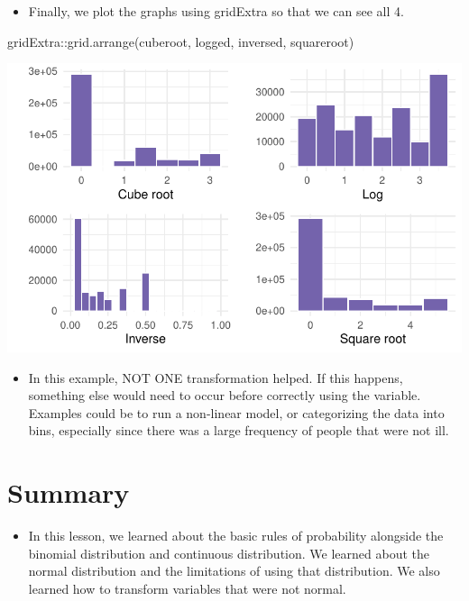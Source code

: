 \documentclass[
  letterpaper,
  DIV=11,
  numbers=noendperiod]{scrreprt}
\newenvironment{Shaded}{\begin{snugshade}}{\end{snugshade}}
\newcommand{\FunctionTok}[1]{\textcolor[rgb]{0.28,0.35,0.67}{#1}}
\newcommand{\NormalTok}[1]{\textcolor[rgb]{0.00,0.23,0.31}{#1}}
\newcommand{\SpecialCharTok}[1]{\textcolor[rgb]{0.37,0.37,0.37}{#1}}
\providecommand{\tightlist}{%
  \setlength{\itemsep}{0pt}\setlength{\parskip}{0pt}}\usepackage{longtable,booktabs,array}
\begin{document}
\begin{itemize}
\tightlist
\item
  Finally, we plot the graphs using gridExtra so that we can see all 4.
\end{itemize}

\begin{Shaded}
\begin{Highlighting}[]
\NormalTok{gridExtra}\SpecialCharTok{::}\FunctionTok{grid.arrange}\NormalTok{(cuberoot, logged, inversed, squareroot)}
\end{Highlighting}
\end{Shaded}

\includegraphics{probability_files/figure-pdf/unnamed-chunk-70-1.pdf}

\begin{itemize}
\tightlist
\item
  In this example, NOT ONE transformation helped. If this happens,
  something else would need to occur before correctly using the
  variable. Examples could be to run a non-linear model, or categorizing
  the data into bins, especially since there was a large frequency of
  people that were not ill.~
\end{itemize}


\chapter{Summary}\label{summary-5}

\begin{itemize}
\tightlist
\item
  In this lesson, we learned about the basic rules of probability
  alongside the binomial distribution and continuous distribution. We
  learned about the normal distribution and the limitations of using
  that distribution. We also learned how to transform variables that
  were not normal.
\end{itemize}
\end{document}
